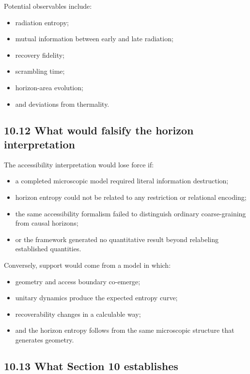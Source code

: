 \documentclass[
  11pt,
]{article}
\providecommand{\tightlist}{%
  \setlength{\itemsep}{0pt}\setlength{\parskip}{0pt}}
\begin{document}
Potential observables include:

\begin{itemize}
\tightlist
\item
  radiation entropy;
\item
  mutual information between early and late radiation;
\item
  recovery fidelity;
\item
  scrambling time;
\item
  horizon-area evolution;
\item
  and deviations from thermality.
\end{itemize}

\subsection{10.12 What would falsify the horizon
interpretation}\label{what-would-falsify-the-horizon-interpretation}

The accessibility interpretation would lose force if:

\begin{itemize}
\tightlist
\item
  a completed microscopic model required literal information
  destruction;
\item
  horizon entropy could not be related to any restriction or relational
  encoding;
\item
  the same accessibility formalism failed to distinguish ordinary
  coarse-graining from causal horizons;
\item
  or the framework generated no quantitative result beyond relabeling
  established quantities.
\end{itemize}

Conversely, support would come from a model in which:

\begin{itemize}
\tightlist
\item
  geometry and access boundary co-emerge;
\item
  unitary dynamics produce the expected entropy curve;
\item
  recoverability changes in a calculable way;
\item
  and the horizon entropy follows from the same microscopic structure
  that generates geometry.
\end{itemize}

\subsection{10.13 What Section 10
establishes}\label{what-section-10-establishes}
\end{document}
